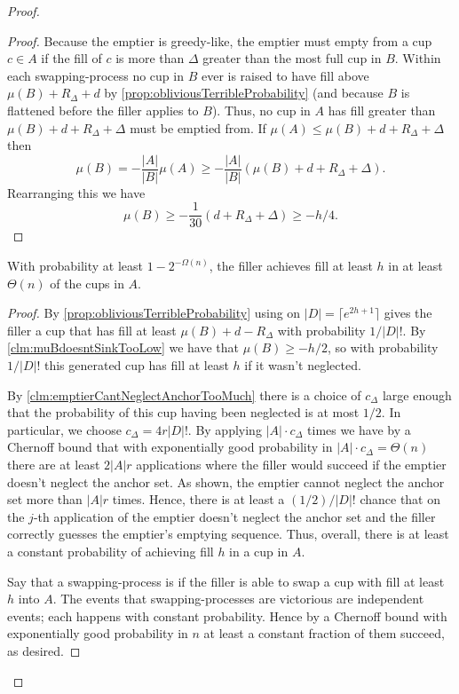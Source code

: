 \begin{proof}
\begin{proof}
  Because the emptier is greedy-like, the emptier must empty from
  a cup $c\in A$ if the fill of $c$ is more than $\Delta$ greater
  than the most full cup in $B$. Within each swapping-process no
  cup in $B$ ever is raised to have fill above $\mu(B) + R_\Delta
  + d$ by \cref{prop:obliviousTerribleProbability} (and because
  $B$ is flattened before the filler applies \randalg to $B$).
  Thus, no cup in $A$ has fill greater than $\mu(B) + d +
  R_\Delta + \Delta$
  must be emptied from. If $\mu(A) \le \mu(B) + d +
  R_\Delta + \Delta$ then
  $$\mu(B) = -\frac{|A|}{|B|}\mu(A) \ge
  -\frac{|A|}{|B|}\left(\mu(B) + d + R_\Delta + \Delta\right).$$
  Rearranging this we have
  $$\mu(B) \ge -\frac{1}{30}(d + R_\Delta + \Delta) \ge -h/4.$$

\end{proof}

\begin{clm}
With probability at least $1-2^{-\Omega(n)}$, the filler achieves fill
at least $h$ in at least $\Theta(n)$ of the cups in $A$. 
\end{clm}
\begin{proof}
  By \cref{prop:obliviousTerribleProbability} using \randalg on
  $|D| = \lceil e^{2h+1} \rceil$ gives the filler a cup that
  has fill at least $\mu(B) + d-R_\Delta$ with probability
  $1/|D|!$. By \cref{clm:muBdoesntSinkTooLow} we have that
  $\mu(B) \ge -h/2$, so with probability $1/|D|!$ this generated
  cup has fill at least $h$ if it wasn't neglected.

  By \cref{clm:emptierCantNeglectAnchorTooMuch} there is a choice
  of $c_\Delta$ large enough that the probability of this cup
  having been neglected is at most $1/2$. In particular, we
  choose $c_\Delta = 4r|D|!$. By applying \randalg $|A|\cdot
  c_\Delta$ times we have by a Chernoff bound that with
  exponentially good probability in $|A|\cdot c_\Delta =
  \Theta(n)$ there are at least $2|A|r$ applications where the
  filler would succeed if the emptier doesn't neglect the anchor
  set. As shown, the emptier cannot
  neglect the anchor set more than $|A|r$ times. Hence, there
  is at least a $(1/2)/|D|!$ chance that on the $j$-th
  application of \randalg the emptier doesn't neglect the anchor
  set and the filler correctly guesses the emptier's emptying
  sequence. Thus, overall, there is at least a constant
  probability of achieving fill $h$ in a cup in $A$.

  Say that a swapping-process is  if the filler
  is able to swap a cup with fill at least $h$ into $A$. The
  events that swapping-processes are victorious are independent
  events; each happens with constant probability. Hence by a
  Chernoff bound with exponentially good probability in $n$ at
  least a constant fraction of them succeed, as desired.


\end{proof}
\end{proof}
